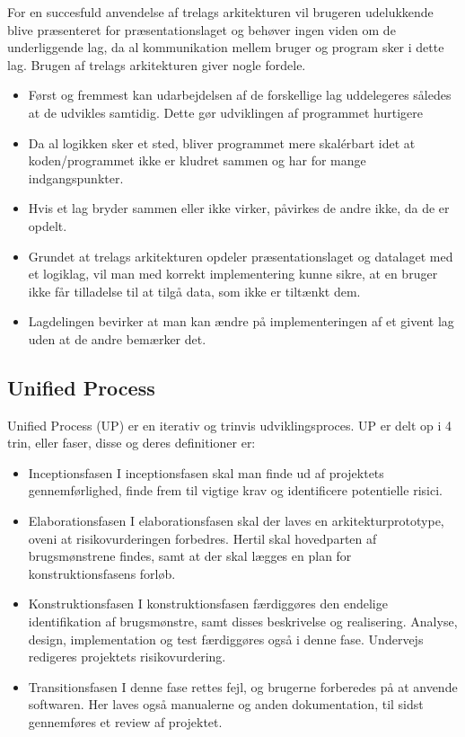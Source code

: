 For en succesfuld anvendelse af trelags arkitekturen vil brugeren udelukkende
blive præsenteret for præsentationslaget og behøver ingen viden om de
underliggende lag, da al kommunikation mellem bruger og program sker i dette
lag. Brugen af trelags arkitekturen giver nogle fordele. 
\begin{itemize}
    \item Først og fremmest kan udarbejdelsen af de forskellige lag uddelegeres
        således at de udvikles samtidig. Dette gør udviklingen af programmet
        hurtigere 
    \item Da al logikken sker et sted, bliver programmet mere
        skalérbart idet at koden/programmet ikke er kludret sammen og har for
        mange indgangspunkter.  
    \item Hvis et lag bryder sammen eller ikke
        virker, påvirkes de andre ikke, da de er opdelt.
    \item Grundet at trelags arkitekturen opdeler præsentationslaget og
        datalaget med et logiklag, vil man med korrekt implementering kunne
        sikre, at en bruger ikke får tilladelse til at tilgå data, som ikke er
        tiltænkt dem. 
    \item Lagdelingen bevirker at man kan ændre på implementeringen af et givent
        lag uden at de andre bemærker det.
\end{itemize}

\subsection{Unified Process} \label{section: Unified Process}
Unified Process (UP) er en iterativ og trinvis udviklingsproces. UP er delt op i 4 trin, eller faser, disse og deres definitioner er:
\begin{itemize}
    \item Inceptionsfasen
        \subitem I inceptionsfasen skal man finde ud af projektets gennemførlighed, finde frem til vigtige krav og identificere potentielle risici.
    \item Elaborationsfasen
        \subitem I elaborationsfasen skal der laves en arkitekturprototype, oveni at risikovurderingen forbedres. Hertil skal hovedparten af brugsmønstrene findes, samt at der skal lægges en plan for konstruktionsfasens forløb.
    \item Konstruktionsfasen
        \subitem I konstruktionsfasen færdiggøres den endelige identifikation af brugsmønstre, samt disses beskrivelse og realisering. Analyse, design, implementation og test færdiggøres også i denne fase. Undervejs redigeres projektets risikovurdering.
    \item Transitionsfasen
        \subitem I denne fase rettes fejl, og brugerne forberedes på at anvende softwaren. Her laves også manualerne og anden dokumentation, til sidst gennemføres et review af projektet. 
\end{itemize}
 
